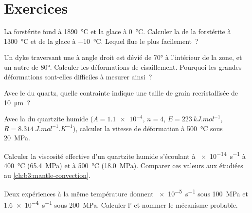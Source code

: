 \section{Exercices}

\begin{exercise}[$\star$]\label{exo:b3:deformation-mechanisms:1}
La forstérite fond à \qty{1890}{\celsius} et la glace à \qty{0}{\celsius}. Calculer
la  de la forstérite à \qty{1300}{\celsius} et de la glace à
\qty{-10}{\celsius}. Lequel flue le plus facilement~?
\end{exercise}

\begin{exercise}[$\star$]\label{exo:b3:deformation-mechanisms:2}
Un dyke traversant une  à angle droit est dévié de
\ang{70} à l'intérieur de la zone, et un autre de \ang{80}. Calculer les déformations
de cisaillement. Pourquoi les grandes déformations sont-elles difficiles à mesurer ainsi~?
\end{exercise}

\begin{exercise}[$\star$]\label{exo:b3:deformation-mechanisms:3}
Avec le  du quartz, quelle contrainte indique une taille de grain
recristallisée de \qty{10}{\micro m}~?
\end{exercise}

\begin{exercise}[$\star$]\label{exo:b3:deformation-mechanisms:4}
Avec la  du quartzite humide ($A = \num{1.1e-4}$, $n = 4$, $E =
\qty{223}{kJ.mol^{-1}}$, $R = \qty{8.314}{J.mol^{-1}.K^{-1}}$), calculer la
vitesse de déformation à \qty{500}{\celsius} sous \qty{20}{MPa}.
\end{exercise}

\begin{exercise}[$\star\star$]\label{exo:b3:deformation-mechanisms:5}
Calculer la viscosité effective d'un quartzite humide s'écoulant à \qty{e-14}{s^{-1}}
à \qty{400}{\celsius} (\qty{65.4}{MPa}) et à \qty{500}{\celsius}
(\qty{18.0}{MPa}). Comparer ces valeurs aux 
étudiées au \cref{ch:b3:mantle-convection}.
\end{exercise}

\begin{exercise}[$\star\star$]\label{exo:b3:deformation-mechanisms:6}
Deux expériences à la même température donnent \qty{e-5}{s^{-1}} sous
\qty{100}{MPa} et \qty{1.6e-4}{s^{-1}} sous \qty{200}{MPa}. Calculer l' et nommer le mécanisme probable.
\end{exercise}

